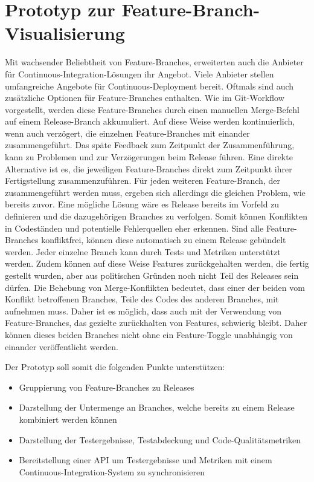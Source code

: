 \section{Prototyp zur Feature-Branch-Visualisierung}

Mit wachsender Beliebtheit von Feature-Branches, erweiterten auch die Anbieter für Continuous-Integration-Lösungen ihr Angebot. Viele Anbieter stellen umfangreiche Angebote für Continuous-Deployment bereit. Oftmals sind auch zusätzliche Optionen für Feature-Branches enthalten. Wie im Git-Workflow vorgestellt, werden diese Feature-Branches durch einen manuellen Merge-Befehl auf einem Release-Branch akkumuliert. Auf diese Weise werden kontinuierlich, wenn auch verzögert, die einzelnen Feature-Branches mit einander zusammengeführt. Das späte Feedback zum Zeitpunkt der Zusammenführung, kann zu Problemen und zur Verzögerungen beim Release führen. Eine direkte Alternative ist es, die jeweiligen Feature-Branches direkt zum Zeitpunkt ihrer Fertigstellung zusammenzuführen. Für jeden weiteren Feature-Branch, der zusammengeführt werden muss, ergeben sich allerdings die gleichen Problem, wie bereits zuvor.
Eine mögliche Lösung wäre es Release bereits im Vorfeld zu definieren und die dazugehörigen Branches zu verfolgen. Somit können Konflikten in Codeständen und potentielle Fehlerquellen eher erkennen. Sind alle Feature-Branches konfliktfrei, können diese automatisch zu einem Release gebündelt werden. Jeder einzelne Branch kann durch Tests und Metriken unterstützt werden. Zudem können auf diese Weise Features zurückgehalten werden, die fertig gestellt wurden, aber aus politischen Gründen noch nicht Teil des Releases sein dürfen. 
Die Behebung von Merge-Konflikten bedeutet, dass einer der beiden vom Konflikt betroffenen Branches, Teile des Codes des anderen Branches, mit aufnehmen muss. Daher ist es möglich, dass auch mit der Verwendung von Feature-Branches, das gezielte zurückhalten von Features, schwierig bleibt. Daher können dieses beiden Branches nicht ohne ein Feature-Toggle unabhängig von einander veröffentlicht werden.

Der Prototyp soll somit die folgenden Punkte unterstützen:
\begin{itemize}
\item Gruppierung von Feature-Branches zu Releases
\item Darstellung der Untermenge an Branches, welche bereits zu einem Release kombiniert werden können
\item Darstellung der Testergebnisse, Testabdeckung und Code-Qualitätsmetriken
\item Bereitstellung einer API um Testergebnisse und Metriken mit einem Continuous-Integration-System zu synchronisieren
\end{itemize}


